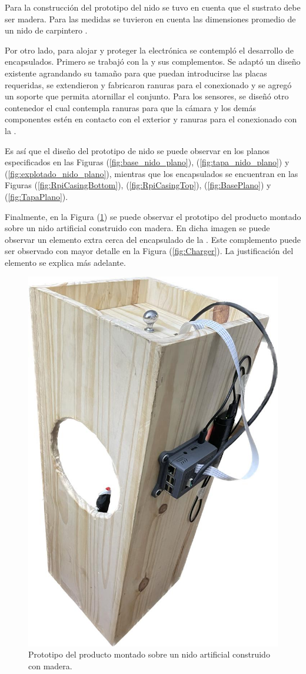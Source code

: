 \label{subsection:nido-sustrato}
Para la construcción del prototipo del nido se tuvo en cuenta que el sustrato debe ser madera. Para las medidas se tuvieron en cuenta las dimensiones promedio de un nido de carpintero \cite{ref:PaperValeriaOjeda}.

Por otro lado, para alojar y proteger la electrónica se contempló el desarrollo de encapsulados. Primero se trabajó con la \rspi y sus complementos. Se adaptó un diseño existente agrandando su tamaño para que puedan introducirse las placas requeridas, se extendieron y fabricaron ranuras para el conexionado y se agregó un soporte que permita atornillar el conjunto. Para los sensores, se diseñó otro contenedor el cual contempla ranuras para que la cámara y los demás componentes estén en contacto con el exterior y ranuras para el conexionado con la \rpi.

Es así que el diseño del prototipo de nido se puede observar en los planos especificados en las Figuras (\ref{fig:base_nido_plano}), (\ref{fig:tapa_nido_plano}) y (\ref{fig:explotado_nido_plano}), mientras que los encapsulados se encuentran en las Figuras (\ref{fig:RpiCasingBottom}), (\ref{fig:RpiCasingTop}), (\ref{fig:BasePlano}) y (\ref{fig:TapaPlano}).

Finalmente, en la Figura (\ref{fig:caja_prototipo}) se puede observar el prototipo del producto montado sobre un nido artificial construido con madera. En dicha imagen se puede observar un elemento extra cerca del encapsulado de la \rspi. Este complemento puede ser observado con mayor detalle en la Figura (\ref{fig:Charger}). La justificación del elemento se explica más adelante.
\begin{figure}[H]
	\centering	\includegraphics[width=0.4\linewidth,page=1]{ImagenesConstruccion del prototipo/caja_prototipo_2}		
	\caption{Prototipo del producto montado sobre un nido artificial construido con madera.}
	\label{fig:caja_prototipo}
\end{figure}

